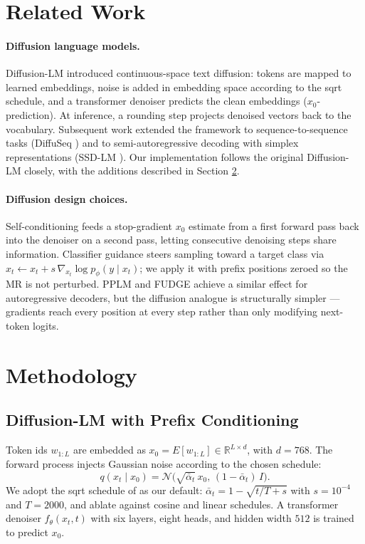 \documentclass{llncs}
\begin{document}
\section{Related Work}
\label{sec:related}

\paragraph{Diffusion language models.}
Diffusion-LM \cite{li2022diffusionlm} introduced continuous-space text
diffusion: tokens are mapped to learned embeddings, noise is added in
embedding space according to the sqrt schedule, and a transformer denoiser
predicts the clean embeddings ($x_0$-prediction). At inference, a rounding
step projects denoised vectors back to the vocabulary. Subsequent work
extended the framework to sequence-to-sequence tasks (DiffuSeq
\cite{gong2023diffuseq}) and to semi-autoregressive decoding with simplex
representations (SSD-LM \cite{han2023ssdlm}). Our implementation follows
the original Diffusion-LM closely, with the additions described in Section
\ref{sec:method}.

\paragraph{Diffusion design choices.}
Self-conditioning \cite{chen2022analog} feeds a stop-gradient $x_0$ estimate
from a first forward pass back into the denoiser on a second pass, letting
consecutive denoising steps share information. Classifier guidance
\cite{dhariwal2021guidance} steers sampling toward a target class via
$x_t \!\leftarrow\! x_t + s\,\nabla_{x_t}\log p_\phi(y\mid x_t)$; we apply it
with prefix positions zeroed so the MR is not perturbed. PPLM
\cite{dathathri2020pplm} and FUDGE \cite{yang2021fudge} achieve a similar
effect for autoregressive decoders, but the diffusion analogue is
structurally simpler --- gradients reach every position at every step
rather than only modifying next-token logits.

\section{Methodology}
\label{sec:method}

\subsection{Diffusion-LM with Prefix Conditioning}

Token ids $w_{1:L}$ are embedded as $x_0 = E[w_{1:L}] \in \mathbb{R}^{L \times d}$,
with $d\!=\!768$. The forward process injects Gaussian noise according to the
chosen schedule:
\begin{equation}
  q(x_t \mid x_0) = \mathcal{N}\!\big(\sqrt{\bar\alpha_t}\, x_0,\, (1-\bar\alpha_t)\,I\big).
\end{equation}
We adopt the sqrt schedule of \cite{li2022diffusionlm} as our default:
$\bar\alpha_t = 1 - \sqrt{t/T + s}$ with $s\!=\!10^{-4}$ and $T\!=\!2000$,
and ablate against cosine \cite{nichol2021improved} and linear
\cite{ho2020ddpm} schedules. A transformer denoiser $f_\theta(x_t, t)$ with
six layers, eight heads, and hidden width $512$ is trained to predict $x_0$.
\end{document}
